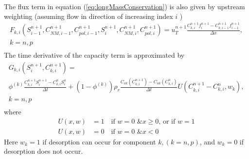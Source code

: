 \documentclass[nanomaterials,article,submit,moreauthors,pdftex]{Definitions/mdpi}
\begin{document}
The flux term in equation (\ref{eq:longMassConservation}) is also given by upstream weighting (assuming flow in direction of increasing index $i$ )
\begin{equation}
\begin{split}
    F_{k,i}\left(S^{n+1}_{i-1}, C^{n+1}_{\textit{NM}, i-1}, C^{n+1}_{pol, i-1}, S^{n+1}_{i}, C^{n+1}_{\textit{NM}, i}, C^{n+1}_{pol, i}\right) = u_T^{n+1} \frac{C^{n+1}_{k,i} f^{n+1}_{i} - C^{n+1}_{k,i-1} f^{n+1}_{i-1}}{\Delta x},\\  k=n,p \\ \quad
\end{split}
\end{equation}
The time derivative of the capacity term is approximated by
\begin{multline}
    G_{k,i}\left(S^{n+1}_{i}, C^{n+1}_{k,i}\right) = \\ 
    \phi^{(k)} \frac{C^{n+1}_{k,i} S^{n+1}_{i} - C^{n}_{k,i} S^{n}_{i}}{\Delta t} + \left(1-\phi^{(k)}\right) \rho_r 
    \frac{C_{ak} \left(C^{n+1}_{k,i}\right) - C_{ak} \left(C^{n}_{k,i}\right)}{\Delta t} U \left(C^{n+1}_{k,i} - C^{n}_{k,i}, w_k \right)
    ,\\ k=n,p \\ \quad
\end{multline}
where
\begin{equation*}
\begin{split}
    U(x,w) &= 1     \quad \text{if } w=0 \text{ \& } x\geq0 \text{, or if } w=1 \\
    U(x,w) &= 0     \quad \text{if } w=0 \text{ \& } x<0 
\end{split}
\end{equation*}
Here  $w_k=1$ if desorption can occur for component $k, (k=n,p)$, and $w_k=0$  if desorption does not occur.
\end{document}
